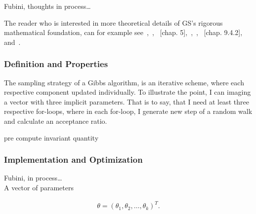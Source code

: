 \documentclass[a4paper,11pt,english]{article}
\begin{document}
			Fubini, thoughts in process\ldots

			
			The reader who is interested in more theoretical details of GS's rigorous mathematical foundation, can for example 
			see~\citep[chap. 14]{brandimarte},~\cite{casella}, ~\citep{gamerman}[chap. 5],~\citep[p. 731]{geman},~\citep[chap. 9]{lee},
			~\citep{prochazka}[chap. 9.4.2], \citep{tanner} and~\citep[p. 388]{shumway}.			


			\subsubsection{Definition and Properties}


        The sampling strategy of a Gibbs algorithm, is an iterative scheme, where each respective component updated individually. To illustrate the 
        point, I can imaging a vector with three implicit parameters. That is to say, that I need at least three respective for-loops, where in each
        for-loop, I generate new step of a random walk and calculate an acceptance ratio.
        
        
        pre compute invariant quantity


			\subsubsection{Implementation and Optimization}

			Fubini, in process\ldots \\
			
			
			A vector of parameters

			\begin{eqnarray*}
				\theta = (\theta_1, \theta_2,\ldots,\theta_k)^T.
			\end{eqnarray*}	 
	
\end{document}
